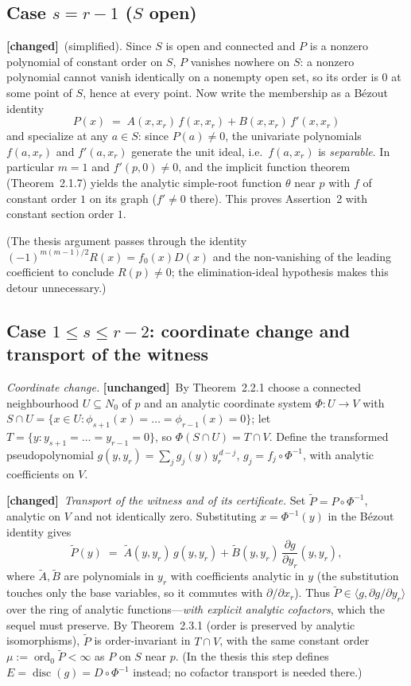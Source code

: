 \documentclass[11pt,a4paper]{article}
\theoremstyle{plain}
\theoremstyle{definition}
\DeclareMathOperator{\ord}{ord}
\DeclareMathOperator{\disc}{disc}
\newcommand{\ideal}[1]{\langle #1\rangle}
\newcommand{\UNCHANGED}{\textbf{[unchanged]}}
\newcommand{\CHANGED}{\textbf{[changed]}}
\begin{document}
\subsection{Case $s=r-1$ ($S$ open)}\label{ssec:open}

\CHANGED\ (simplified). Since $S$ is open and connected and $P$ is a nonzero
polynomial of constant order on $S$, $P$ vanishes nowhere on $S$: a nonzero
polynomial cannot vanish identically on a nonempty open set, so its order is
$0$ at some point of $S$, hence at every point. Now write the membership as a
B\'ezout identity
\[
  P(x) \;=\; A(x,x_r)\,f(x,x_r)+B(x,x_r)\,f'(x,x_r)
\]
and specialize at any $a\in S$: since $P(a)\neq 0$, the univariate polynomials
$f(a,x_r)$ and $f'(a,x_r)$ generate the unit ideal, i.e.\ $f(a,x_r)$ is
\emph{separable}. In particular $m=1$ and $f'(p,0)\neq 0$, and the implicit
function theorem (Theorem~2.1.7) yields the analytic simple-root function
$\theta$ near $p$ with $f$ of constant order $1$ on its graph
($f'\neq0$ there). This proves Assertion~2 with constant section order $1$.

(The thesis argument passes through the identity
$(-1)^{m(m-1)/2}R(x)=f_0(x)D(x)$ and the non-vanishing of the leading
coefficient to conclude $R(p)\neq0$; the elimination-ideal hypothesis makes
this detour unnecessary.)

\subsection{Case $1\le s\le r-2$: coordinate change and transport of the
witness}\label{ssec:transport}

\emph{Coordinate change.} \UNCHANGED\ By Theorem~2.2.1 choose a connected
neighbourhood $U\subseteq N_0$ of $p$ and an analytic coordinate system
$\Phi:U\to V$ with
$S\cap U=\{x\in U:\phi_{s+1}(x)=\dots=\phi_{r-1}(x)=0\}$; let
$T=\{y:y_{s+1}=\dots=y_{r-1}=0\}$, so $\Phi(S\cap U)=T\cap V$. Define the
transformed pseudopolynomial
$g(y,y_r)=\sum_j g_j(y)\,y_r^{\,d-j}$, $g_j=f_j\circ\Phi^{-1}$, with analytic
coefficients on $V$.

\CHANGED\ \emph{Transport of the witness and of its certificate.} Set
$\widetilde P=P\circ\Phi^{-1}$, analytic on $V$ and not identically zero.
Substituting $x=\Phi^{-1}(y)$ in the B\'ezout identity gives
\begin{equation}\label{eq:transported-membership}
  \widetilde P(y)\;=\;\widetilde A(y,y_r)\,g(y,y_r)
    +\widetilde B(y,y_r)\,\frac{\partial g}{\partial y_r}(y,y_r),
\end{equation}
where $\widetilde A,\widetilde B$ are polynomials in $y_r$ with coefficients
analytic in $y$ (the substitution touches only the base variables, so it
commutes with $\partial/\partial x_r$). Thus
$\widetilde P\in\ideal{g,\partial g/\partial y_r}$ over the ring of analytic
functions---\emph{with explicit analytic cofactors}, which the sequel must
preserve. By Theorem~2.3.1 (order is preserved by analytic isomorphisms),
$\widetilde P$ is order-invariant in $T\cap V$, with the same constant order
$\mu:=\ord_0\widetilde P<\infty$ as $P$ on $S$ near $p$.
(In the thesis this step defines $E=\disc(g)=D\circ\Phi^{-1}$ instead; no
cofactor transport is needed there.)
\end{document}
